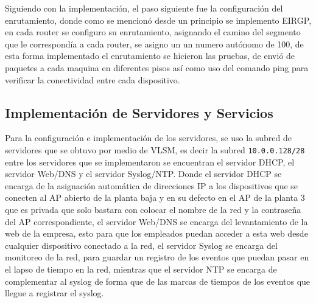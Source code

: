 \documentclass[letterpaper,11pt]{article}
\begin{document}
    Siguiendo con la implementación, el paso siguiente fue la configuración del enrutamiento, donde como se mencionó desde un principio se implemento EIRGP, en cada router se
    configuro su enrutamiento, asignando el camino del segmento que le correspondía a cada router, 
    se asigno un un numero autónomo de 100, de esta forma implementado el enrutamiento se hicieron las pruebas, de envió de paquetes a cada maquina en diferentes pisos así como uso del comando ping para verificar la conectividad entre cada dispositivo.

    \subsection{Implementación de Servidores y Servicios}

    Para la configuración e implementación de los servidores, se uso la subred de servidores que se obtuvo por medio de VLSM, es decir la subred \texttt{10.0.0.128/28} entre los servidores que se implementaron se encuentran el servidor DHCP, el servidor Web/DNS y el servidor Syslog/NTP. Donde el servidor DHCP se encarga de la asignación automática de direcciones IP a los dispositivos que se conecten al AP abierto de la planta baja y en su defecto en el AP de la planta 3 que es privada que solo bastara con colocar el nombre de la red y la contraseña del AP correspondiente, el servidor Web/DNS se encarga del levantamiento de la web de la empresa, esto para que los empleados puedan acceder a esta web desde cualquier dispositivo conectado a la red, el servidor Syslog se encarga del monitoreo de la red, para guardar un registro de los eventos que puedan pasar en el lapso de tiempo en la red, mientras que el servidor NTP se encarga de complementar al syslog de forma que de las marcas de tiempos de los eventos que llegue a registrar el syslog.
\end{document}
